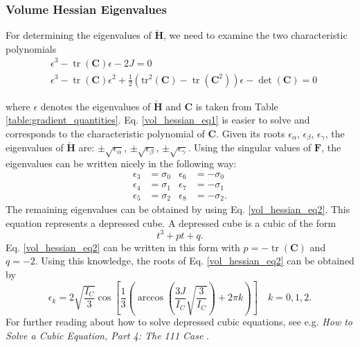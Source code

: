 
\subsubsection{Volume Hessian Eigenvalues}
For determining the eigenvalues of $\mathbf{\check{H}}$, we need to examine the two characteristic polynomials
\begin{align}
&\epsilon^3 - \operatorname{tr}(\mathbf{C}) \epsilon - 2 J = 0  \label{vol_hessian_eq1} \\
&\epsilon^3 - \operatorname{tr}(\mathbf{C}) \epsilon^2 + \frac{1}{2} \left( \operatorname{tr^2}(\mathbf{C}) - \operatorname{tr}(\mathbf{C}^2) \right) \epsilon - \operatorname{det}(\mathbf{C}) = 0 \label{vol_hessian_eq2}
\end{align}

where $\epsilon$ denotes the eigenvalues of $\mathbf{\check{H}}$ and $\mathbf{C}$ is taken from Table \ref{table:gradient_quantities}. Eq. \ref{vol_hessian_eq1} is easier to solve and corresponds to the characteristic polynomial of $\mathbf{C}$. Given its roots $\epsilon_\alpha$, $\epsilon_\beta$, $\epsilon_\gamma$, the eigenvalues of $\mathbf{\check{H}}$ are: $\pm \sqrt{\epsilon_\alpha}$, $\pm \sqrt{\epsilon_\beta}$, $\pm \sqrt{\epsilon_\gamma}$. Using the singular values of $\mathbf{F}$, the eigenvalues can be written nicely in the following way:
\begin{align*}
\epsilon_3 &= \sigma_0 & \epsilon_6 &= -\sigma_0 \\
\epsilon_4 &= \sigma_1 & \epsilon_7 &= -\sigma_1 \\
\epsilon_5 &= \sigma_2 & \epsilon_8 &= -\sigma_2.
\end{align*}
The remaining eigenvalues can be obtained by using Eq. \ref{vol_hessian_eq2}. This equation represents a depressed cube. A depressed cube is a cubic of the form
\[
t^3 + pt + q. 
\]
Eq. \ref{vol_hessian_eq2} can be written in this form with $p=-\operatorname{tr}(\mathbf{C})$ and $q= -2$. Using this knowledge, the roots of Eq. \ref{vol_hessian_eq2} can be obtained by
\[
\epsilon_k = 2 \sqrt{\frac{I_C}{3}} \operatorname{cos}\left[ \frac{1}{3} \left( \operatorname{arccos}\left(\frac{3 J}{I_C} \sqrt{\frac{3}{I_C}} \right) + 2 \pi k \right) \right] \quad  k= 0,1,2.
\]
For further reading about how to solve depressed cubic equations, see e.g. \textit{How to Solve a Cubic Equation, Part 4: The 111 Case} \cite{4052506}.

